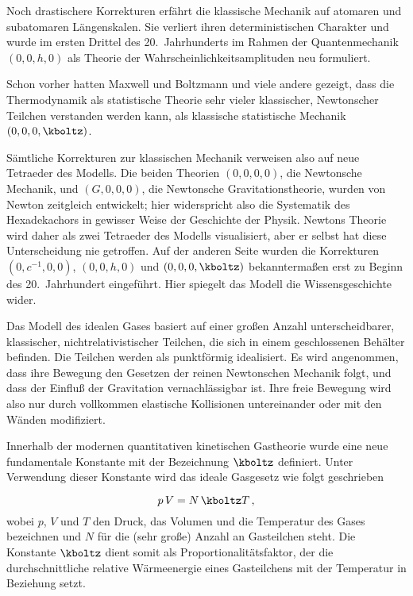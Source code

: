 \documentclass{scrartcl}
\begin{document}
Noch drastischere Korrekturen erfährt die klassische Mechanik auf atomaren und subatomaren Längenskalen. Sie verliert ihren deterministischen Charakter und wurde im ersten Drittel des 20.\ Jahrhunderts im Rahmen der Quantenmechanik $(0,0,h,0)$ als Theorie der Wahrscheinlichkeitsamplituden neu formuliert.

Schon vorher hatten Maxwell und Boltzmann und viele andere gezeigt, dass die Thermodynamik als statistische Theorie sehr vieler klassischer, Newtonscher Teilchen verstanden werden kann, als klassische statistische Mechanik $(0,0,0,\kboltz)$.

Sämtliche Korrekturen zur klassischen Mechanik verweisen also auf neue Tetraeder des Modells. Die beiden Theorien $(0,0,0,0)$, die Newtonsche Mechanik, und $(G,0,0,0)$, die Newtonsche Gravitationstheorie, wurden von Newton zeitgleich entwickelt; hier widerspricht also die Systematik des Hexadekachors in gewisser Weise der Geschichte der Physik. Newtons Theorie wird daher als zwei Tetraeder des Modells visualisiert, aber er selbst hat diese Unterscheidung nie getroffen. Auf der anderen Seite wurden die Korrekturen $(0,c^{-1},0,0)$, $(0,0,h,0)$ und $(0,0,0,\kboltz)$ bekanntermaßen erst zu Beginn des 20.\ Jahrhundert eingeführt. Hier spiegelt das Modell die Wissensgeschichte wider.


\newpage {}
\label{sec:0001}

Das Modell des idealen Gases basiert auf einer großen Anzahl unterscheidbarer, klassischer, nichtrelativistischer Teilchen, die sich in einem geschlossenen Behälter befinden. Die Teilchen werden als punktförmig idealisiert. Es wird angenommen, dass ihre Bewegung den Gesetzen der reinen Newtonschen Mechanik folgt, und dass der Einfluß der Gravitation vernachlässigbar ist. Ihre freie Bewegung wird also nur durch vollkommen elastische Kollisionen untereinander oder mit den Wänden modifiziert.

Innerhalb der modernen quantitativen kinetischen Gastheorie wurde eine neue fundamentale Konstante mit der Bezeichnung $\kboltz$ definiert. Unter Verwendung dieser Konstante wird das ideale Gasgesetz wie folgt geschrieben

\begin{equation*}\label{eq:ideal-kb}
  p\, V=N\, \kboltz T\,,
\end{equation*}
%
wobei $p$, $V$ und $T$ den Druck, das Volumen und die Temperatur des Gases bezeichnen und $N$ für die (sehr große) Anzahl an Gasteilchen steht. Die Konstante $\kboltz$ dient somit als Proportionalitätsfaktor, der die durchschnittliche relative Wärmeenergie eines Gasteilchens mit der Temperatur in Beziehung setzt.
\end{document}
